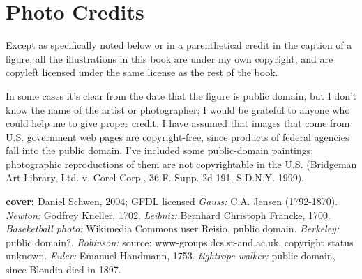 \chapter{Photo Credits}

\footnotesize

Except as specifically noted below or in a parenthetical credit in the
caption of a figure, all the illustrations in this book are
under my own copyright, and are copyleft licensed under the same license
as the rest of the book. 

In some cases it's clear from the date that the
figure is public domain, but I don't know the name of the artist or photographer; I would
be grateful to anyone who could help me to give proper credit.
I have assumed that images
that come from U.S. government web pages are copyright-free, since products
of federal agencies fall into the public domain.
I've included some
public-domain paintings; photographic reproductions of them are not
copyrightable in the U.S. (Bridgeman Art Library, Ltd. v. Corel Corp.,
36 F. Supp. 2d 191, S.D.N.Y. 1999).

\begin{sloppypar}
\noindent

\newcommand{\photocredit}[1]{\footnotesize{(\textit{#1})}}%
\newcommand{\docred}[3]{\textbf{#1} \emph{#2:} #3.\quad}
\newcommand{\cred}[3]{\docred{\pageref{fig:#1}}{#2}{#3}}
\newcommand{\credtwo}[4]{\docred{\pageref{fig:#1},\pageref{fig:#2}}{#3}{#4}}
\newcommand{\credthree}[5]{\docred{\pageref{fig:#1},\pageref{fig:#2},\pageref{fig:#3}}{#4}{#5}}

\textbf{cover:} Daniel Schwen, 2004; GFDL licensed
\cred{gauss}{Gauss}{C.A. Jensen (1792-1870)}
\cred{newton}{Newton}{Godfrey Kneller, 1702}
\cred{leibniz}{Leibniz}{Bernhard Christoph Francke, 1700}
\cred{basketball}{Baseketball photo}{Wikimedia Commons user Reisio, public domain}
\cred{berkeley}{Berkeley}{public domain?}
\cred{robinson}{Robinson}{source: www-groups.dcs.st-and.ac.uk, copyright status unknown}
\cred{euler}{Euler}{Emanuel Handmann, 1753}
\cred{blondin}{tightrope walker}{public domain, since Blondin died in 1897}

\end{sloppypar}\normalsize
